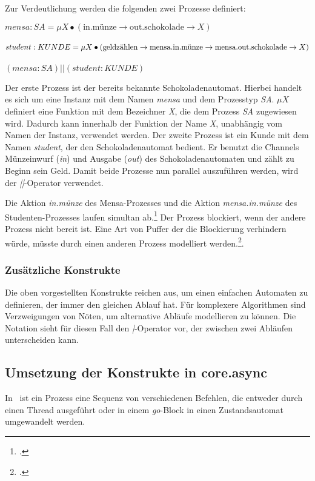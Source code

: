 Zur Verdeutlichung werden die folgenden zwei Prozesse definiert:

\begin{addmargin}[1cm]{0cm}
$mensa:SA = \mu X \bullet (\text{in.münze} \rightarrow \text{out.schokolade} \rightarrow X)$\\\\
$student:KUNDE = \mu X \bullet (\text{geldzählen} \rightarrow \text{mensa.in.münze} \rightarrow \\ \text{mensa.out.schokolade} \rightarrow  X)$\\\\
$ (mensa:SA) || (student:KUNDE) $
\end{addmargin}

Der erste Prozess ist der bereits bekannte Schokoladenautomat. Hierbei handelt es sich um eine Instanz mit dem Namen \textit{mensa} und dem Prozesstyp \textit{SA}. $\mu X$ definiert eine Funktion mit dem Bezeichner \textit{X}, die dem Prozess \textit{SA} zugewiesen wird. Dadurch kann innerhalb der Funktion der Name \textit{X}, unabhängig vom Namen der Instanz,  verwendet werden. Der zweite Prozess ist ein Kunde mit dem Namen \textit{student}, der den Schokoladenautomat bedient. Er benutzt die Channels Münzeinwurf (\textit{in}) und Ausgabe (\textit{out}) des Schokoladenautomaten und zählt zu Beginn sein Geld. Damit beide Prozesse nun parallel auszuführen werden, wird der \textit{||}-Operator verwendet.

Die Aktion \textit{in.münze} des Mensa-Prozesses und die Aktion \textit{mensa.in.münze} des Studenten-Prozesses laufen simultan ab.\footcite[vgl][Seite 117]{CSPBOOK} Der Prozess blockiert, wenn der andere Prozess nicht bereit ist. Eine Art von Puffer der die Blockierung verhindern würde, müsste durch einen anderen Prozess modelliert werden.\footcite[vgl.][Seite 133]{CSPBOOK}.

\subsubsection{Zusätzliche Konstrukte}
Die oben vorgestellten Konstrukte reichen aus, um einen einfachen Automaten zu definieren, der immer den gleichen Ablauf hat. Für komplexere Algorithmen sind Verzweigungen von Nöten, um alternative Abläufe modellieren zu können. Die Notation sieht für diesen Fall den \textit{|}-Operator vor, der zwischen zwei Abläufen unterscheiden kann.

\subsection{Umsetzung der Konstrukte in core.async}
In \CA\ ist ein Prozess eine Sequenz von verschiedenen Befehlen, die entweder durch einen Thread ausgeführt oder in einem \textit{go}-Block in einen Zustandsautomat umgewandelt werden.

